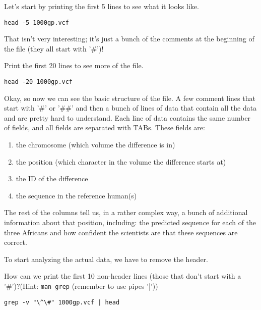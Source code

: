 \begin{steps}
Let's start by printing the first 5 lines to see what it looks like.
\begin{lstlisting}
head -5 1000gp.vcf
\end{lstlisting}
\end{steps}

\begin{note}
That isn't very interesting; it's just a bunch of the comments at the beginning of the file (they all start with '\#')! 
\end{note}

\begin{steps}
Print the first 20 lines to see more of the file.
\begin{lstlisting}
head -20 1000gp.vcf
\end{lstlisting}
\end{steps}

\begin{note}
Okay, so now we can see the basic structure of the file. A few comment lines that start with '\#' or '\#\#' and then a bunch of lines of data that contain all the data and are pretty hard to understand. Each line of data contains the same number of fields, and all fields are separated with TABs. These fields are:
\begin{enumerate}[style=multiline,labelindent=0cm,align=left,leftmargin=0.5cm]
\item the chromosome (which volume the difference is in)
\item the position (which character in the volume the difference starts at)
\item the ID of the difference
\item the sequence in the reference human(s)
\end{enumerate}
The rest of the columns tell us, in a rather complex way, a bunch of additional information about that position, including: the predicted sequence for each of the three Africans and how confident the scientists are that these sequences are correct.

To start analyzing the actual data, we have to remove the header.
\end{note}

\begin{questions}
How can we print the first 10 non-header lines (those that don't start with a '\#')?(Hint: \texttt{man grep} (remember to use pipes '|'))
\begin{answer}
\begin{lstlisting}
grep -v "\^\#" 1000gp.vcf | head  
\end{lstlisting}
\end{answer}
\end{questions}

